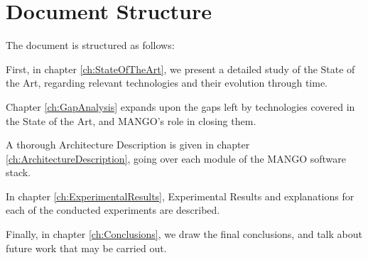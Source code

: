 \section{Document Structure}

The document is structured as follows:

First, in chapter \ref{ch:StateOfTheArt}, we present a detailed study of the State of the Art, regarding relevant technologies and their evolution through time.

Chapter \ref{ch:GapAnalysis} expands upon the gaps left by technologies covered in the State of the Art, and MANGO's role in closing them.

A thorough Architecture Description is given in chapter \ref{ch:ArchitectureDescription}, going over each module of the MANGO software stack.

In chapter \ref{ch:ExperimentalResults}, Experimental Results and explanations for each of the conducted experiments are described.

Finally, in chapter \ref{ch:Conclusions}, we draw the final conclusions, and talk about future work that may be carried out.


